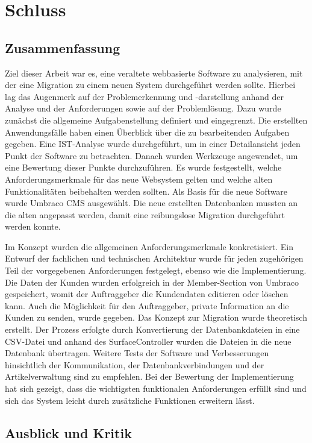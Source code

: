 \chapter{Schluss}
\section{Zusammenfassung}

Ziel dieser Arbeit war es, eine veraltete webbasierte Software zu analysieren, mit der eine Migration zu einem neuen System durchgeführt werden sollte. Hierbei lag das Augenmerk auf der Problemerkennung und -darstellung anhand der Analyse und der Anforderungen sowie auf der Problemlösung.
Dazu wurde zunächst die allgemeine Aufgabenstellung definiert und eingegrenzt. Die erstellten Anwendungsfälle haben einen Überblick über die zu bearbeitenden Aufgaben gegeben. Eine IST-Analyse wurde durchgeführt, um in einer Detailansicht jeden Punkt der Software zu betrachten. Danach wurden Werkzeuge angewendet, um eine Bewertung dieser Punkte durchzuführen. Es wurde festgestellt, welche Anforderungsmerkmale für das neue Websystem gelten und welche alten Funktionalitäten beibehalten werden sollten. Als Basis für die neue Software wurde Umbraco CMS ausgewählt. Die neue erstellten Datenbanken mussten an die alten angepasst werden, damit eine reibungslose Migration durchgeführt werden konnte.

Im Konzept wurden die allgemeinen Anforderungsmerkmale konkretisiert. Ein Entwurf der fachlichen und technischen Architektur wurde für jeden zugehörigen Teil der vorgegebenen Anforderungen festgelegt, ebenso wie die Implementierung. Die Daten der Kunden wurden erfolgreich in der Member-Section von Umbraco gespeichert, womit der Auftraggeber die Kundendaten editieren oder löschen kann. Auch die Möglichkeit für den Auftraggeber, private Information an die Kunden zu senden, wurde gegeben. Das Konzept zur Migration wurde theoretisch erstellt. Der Prozess erfolgte durch Konvertierung der Datenbankdateien in eine CSV-Datei und anhand des SurfaceController wurden die Dateien in die neue Datenbank übertragen. Weitere Tests der Software und Verbesserungen hinsichtlich der Kommunikation, der Datenbankverbindungen und der Artikelverwaltung sind zu empfehlen. Bei der Bewertung der Implementierung hat sich gezeigt, dass die wichtigsten funktionalen Anforderungen erfüllt sind und sich das System leicht durch zusätzliche Funktionen erweitern lässt.


\section{Ausblick und Kritik}

